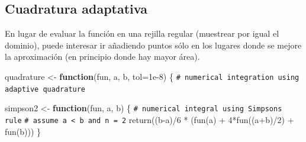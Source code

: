 \documentclass[
]{book}
\newenvironment{Shaded}{\begin{snugshade}}{\end{snugshade}}
\newcommand{\AttributeTok}[1]{\textcolor[rgb]{0.77,0.63,0.00}{#1}}
\newcommand{\CommentTok}[1]{\textcolor[rgb]{0.56,0.35,0.01}{\textit{#1}}}
\newcommand{\ControlFlowTok}[1]{\textcolor[rgb]{0.13,0.29,0.53}{\textbf{#1}}}
\newcommand{\DecValTok}[1]{\textcolor[rgb]{0.00,0.00,0.81}{#1}}
\newcommand{\FloatTok}[1]{\textcolor[rgb]{0.00,0.00,0.81}{#1}}
\newcommand{\FunctionTok}[1]{\textcolor[rgb]{0.00,0.00,0.00}{#1}}
\newcommand{\NormalTok}[1]{#1}
\newcommand{\OtherTok}[1]{\textcolor[rgb]{0.56,0.35,0.01}{#1}}
\newcommand{\SpecialCharTok}[1]{\textcolor[rgb]{0.00,0.00,0.00}{#1}}
\theoremstyle{break}
\theoremstyle{nonumberplain}
\renewcommand{\CommentTok}[1]{\textcolor[rgb]{0.41,0.41,0.41}{\texttt{#1}}}
\begin{document}
\hypertarget{cuadratura-adaptativa}{%
\subsection{Cuadratura adaptativa}\label{cuadratura-adaptativa}}

En lugar de evaluar la función en una rejilla regular (muestrear por igual el dominio),
puede interesar ir añadiendo puntos sólo en los lugares donde se mejore la aproximación
(en principio donde hay mayor área).

\begin{Shaded}
\begin{Highlighting}[]
\NormalTok{quadrature }\OtherTok{\textless{}{-}} \ControlFlowTok{function}\NormalTok{(fun, a, b, }\AttributeTok{tol=}\FloatTok{1e{-}8}\NormalTok{) \{}
    \CommentTok{\# numerical integration using adaptive quadrature}

\NormalTok{  simpson2 }\OtherTok{\textless{}{-}} \ControlFlowTok{function}\NormalTok{(fun, a, b) \{}
    \CommentTok{\# numerical integral using Simpson\textquotesingle{}s rule}
    \CommentTok{\# assume a \textless{} b and n = 2}
    \FunctionTok{return}\NormalTok{((b}\SpecialCharTok{{-}}\NormalTok{a)}\SpecialCharTok{/}\DecValTok{6} \SpecialCharTok{*}\NormalTok{ (}\FunctionTok{fun}\NormalTok{(a) }\SpecialCharTok{+} \DecValTok{4}\SpecialCharTok{*}\FunctionTok{fun}\NormalTok{((a}\SpecialCharTok{+}\NormalTok{b)}\SpecialCharTok{/}\DecValTok{2}\NormalTok{) }\SpecialCharTok{+} \FunctionTok{fun}\NormalTok{(b)))}
\NormalTok{  \}}
 

\end{Highlighting}
\end{Shaded}
\end{document}
